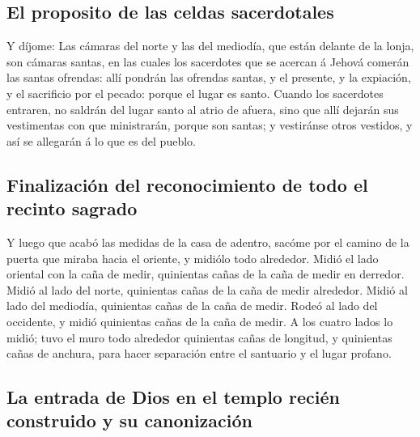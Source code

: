 \hypertarget{el-proposito-de-las-celdas-sacerdotales}{%
\subsection{El proposito de las celdas
sacerdotales}\label{el-proposito-de-las-celdas-sacerdotales}}

 Y díjome: Las cámaras del norte y las del mediodía, que
están delante de la lonja, son cámaras santas, en las cuales los
sacerdotes que se acercan á Jehová comerán las santas ofrendas: allí
pondrán las ofrendas santas, y el presente, y la expiación, y el
sacrificio por el pecado: porque el lugar es santo. 
Cuando los sacerdotes entraren, no saldrán del lugar santo al atrio de
afuera, sino que allí dejarán sus vestimentas con que ministrarán,
porque son santas; y vestiránse otros vestidos, y así se allegarán á lo
que es del pueblo.

\hypertarget{finalizaciuxf3n-del-reconocimiento-de-todo-el-recinto-sagrado}{%
\subsection{Finalización del reconocimiento de todo el recinto
sagrado}\label{finalizaciuxf3n-del-reconocimiento-de-todo-el-recinto-sagrado}}

 Y luego que acabó las medidas de la casa de adentro,
sacóme por el camino de la puerta que miraba hacia el oriente, y midiólo
todo alrededor.  Midió el lado oriental con la caña de
medir, quinientas cañas de la caña de medir en derredor. 
Midió al lado del norte, quinientas cañas de la caña de medir alrededor.
 Midió al lado del mediodía, quinientas cañas de la caña
de medir.  Rodeó al lado del occidente, y midió
quinientas cañas de la caña de medir.  A los cuatro lados
lo midió; tuvo el muro todo alrededor quinientas cañas de longitud, y
quinientas cañas de anchura, para hacer separación entre el santuario y
el lugar profano.

\hypertarget{la-entrada-de-dios-en-el-templo-reciuxe9n-construido-y-su-canonizaciuxf3n}{%
\subsection{La entrada de Dios en el templo recién construido y su
canonización}\label{la-entrada-de-dios-en-el-templo-reciuxe9n-construido-y-su-canonizaciuxf3n}}

